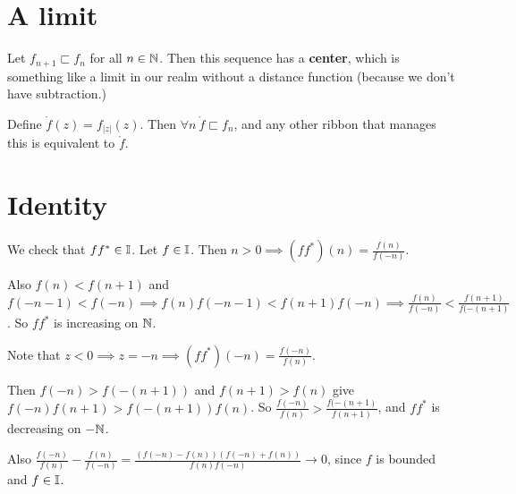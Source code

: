 \documentclass{article}
\renewcommand{\b}{\textbf}
\newcommand{\ribbons}{\Bbb I}
\newcommand{\forks}{ \sqsubset}
\renewcommand{\center}{\mathring f  }
\begin{document}
{{\section{A limit}

Let  $f_{n+1} \forks f_n$ for all $n \in \Bbb N$. Then this sequence has a \b{center}, which is something like a limit in our realm without a distance function (because we don't have subtraction.) 

Define $\center(z) =  f_{|z|}(z).$ Then $\forall n \ \center \forks f_n$, and any other ribbon that manages this is equivalent to $\center$.

\section{Identity}
We check that $ff^* \in \ribbons$. Let $f \in \ribbons$. Then $n > 0 \implies (ff^*)(n) = \frac{f(n)}{f(-n)}$. 

Also $f(n) < f(n+1)$ and $f(-n-1) < f(-n)  \implies f(n)f(-n-1) < f(n+1)f(-n) \implies \frac{f(n)}{f(-n)} < \frac{f(n+1)}{f(-(n+1)} $. So $ff^*$ is increasing on $\Bbb N$. 

Note that $z < 0 \implies z = -n \implies (ff^*)(-n) = \frac{f(-n)}{f(n)}$.

Then $f(-n) > f(-(n+1))$ and $f(n+1) > f(n)$ give $f(-n)f(n+1) > f(-(n+1))f(n)$. So $\frac{f(-n)}{f(n)} > \frac{f(-(n+1)}{f(n+1)}$, and $ff^*$ is decreasing on $- \Bbb N$.

Also $\frac{f(-n)}{f(n)}-\frac{f(n)}{f(-n)} = \frac{(f(-n)-f(n))(f(-n)+f(n))}{f(n)f(-n)} \to 0$, since $f$ is bounded and $f \in \ribbons$. 
}}
\end{document}
